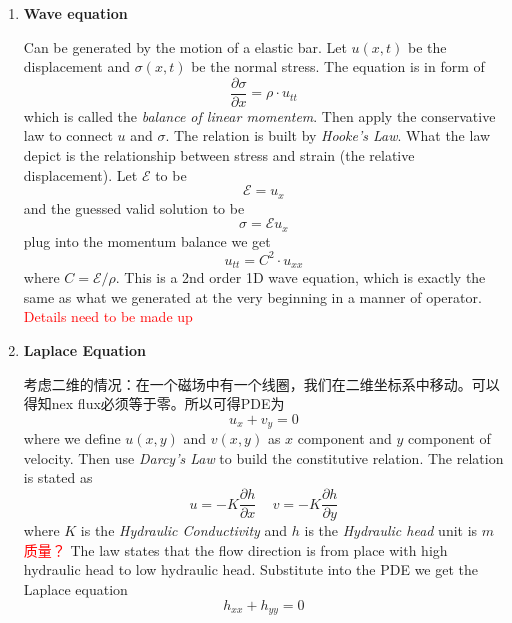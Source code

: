 \documentclass[10pt]{article}
\newenvironment{changemargin}[2]{%
  \begin{list}{}{%
    \setlength{\topsep}{0pt}%
    \setlength{\leftmargin}{#1}%
    \setlength{\rightmargin}{#2}%
    \setlength{\listparindent}{\parindent}%
    \setlength{\itemindent}{\parindent}%
    \setlength{\parsep}{\parskip}%
  }%
  \item[]}{\end{list}}
\begin{document}
\begin{changemargin}{-0.125in}{0in}
\begin{enumerate}
\begin{enumerate}
\begin{enumerate}
	                 
	                 \bigskip
	                 
	                \end{enumerate}
	                
	                
	                \item \textbf{Wave equation}
	                 
	                  \smallskip
	                  
	                  Can be generated by the motion of a elastic bar. Let $u(x,t)$ be the displacement and  $\sigma (x,t)$ be the normal stress. The equation is in form of 
	                  \[
	                  \frac{\partial \sigma}{\partial x} = \rho \cdot u_{tt}
	                  \]
                     which is called the \textit{balance of linear momentem}. Then apply the conservative law to connect $u$ and $\sigma$. The relation is built by \textit{Hooke's Law}. What the law depict is the relationship between stress and strain (the relative displacement). Let $\mathcal{E}$ to be 
                     \[
                     \mathcal{E} = u_x
                     \]
	                 and the guessed valid solution to be 
	                 \[
	                 \sigma =  \mathcal{E} u_x 
	                 \]
	                 plug into the momentum balance we get 
	                 \[
	                 u_{tt} = C^2 \cdot u_{xx}
	                 \]
	                 where $C = \mathcal{E} /\rho$. This is a 2nd order 1D wave equation, which is exactly the same as what we generated at the very beginning in a manner of operator. \textcolor{red}{Details need to be made up} 
	                 
	                 \bigskip
	                 
	                 \item \textbf{Laplace Equation}
	            
	                 \smallskip
	                 
	                 考虑二维的情况：在一个磁场中有一个线圈，我们在二维坐标系中移动。可以得知nex flux必须等于零。所以可得PDE为
	                 \[
	                 u_x + v_y = 0
	                 \]
	                 where we define $u(x,y)$ and $v(x,y)$ as $x$ component and $y$ component of velocity. Then use \textit{Darcy's Law} to build the constitutive relation. The relation is stated as 
	                 \[
	                 u = - K \frac{\partial h}{\partial x}\,\,\,\,\,\,\, v = - K \frac{\partial h}{\partial y}
	                 \]
	                 where $K$ is the \textit{Hydraulic Conductivity} and $h$ is the \textit{Hydraulic head} unit is $m$ \textcolor{red}{质量？} The law states that the flow direction is from place with high hydraulic head to low hydraulic head. Substitute into the PDE we get the Laplace equation 
	                 \[
	                 h_{xx} + h_{yy} = 0
	                 \]
	              

\end{enumerate}
\end{enumerate}
\end{changemargin}
\end{document}
